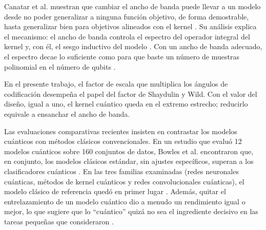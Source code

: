 Canatar et al. muestran que cambiar el ancho de banda puede llevar a un modelo desde no poder generalizar a ninguna función objetivo, de forma demostrable, hasta generalizar bien para objetivos alineados con el kernel \cite{Canatar2023Bandwidth}.
Su análisis explica el mecanismo: el ancho de banda controla el espectro del operador integral del kernel y, con él, el sesgo inductivo del modelo \cite{Canatar2023Bandwidth}.
Con un ancho de banda adecuado, el espectro decae lo suficiente como para que baste un número de muestras polinomial en el número de qubits \cite{Canatar2023Bandwidth}.

En el presente trabajo, el factor de escala que multiplica los ángulos de codificación desempeña el papel del factor de Shaydulin y Wild. Con el valor del diseño, igual a uno, el kernel cuántico queda en el extremo estrecho; reducirlo equivale a ensanchar el ancho de banda.

Las evaluaciones comparativas recientes insisten en contrastar los modelos cuánticos con métodos clásicos convencionales.
En un estudio que evaluó 12 modelos cuánticos sobre 160 conjuntos de datos, Bowles et al. encontraron que, en conjunto, los modelos clásicos estándar, sin ajustes específicos, superan a los clasificadores cuánticos \cite{Bowles2024Benchmarking}.
En las tres familias examinadas (redes neuronales cuánticas, métodos de kernel cuánticos y redes convolucionales cuánticas), el modelo clásico de referencia quedó en primer lugar \cite{Bowles2024Benchmarking}.
Además, quitar el entrelazamiento de un modelo cuántico dio a menudo un rendimiento igual o mejor, lo que sugiere que lo ``cuántico'' quizá no sea el ingrediente decisivo en las tareas pequeñas que consideraron \cite{Bowles2024Benchmarking}.


